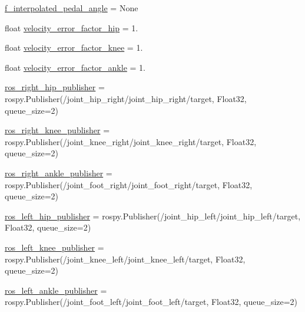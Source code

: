 \begin{DoxyCompactItemize}
\item 
\mbox{\hyperlink{namespacepedal__simulation_af51976e71e077d3bd6d7336c1ed3bbda}{f\+\_\+interpolated\+\_\+pedal\+\_\+angle}} = None
\item 
float \mbox{\hyperlink{namespacepedal__simulation_a056c3f5ea9318245510e21f25d27d64b}{velocity\+\_\+error\+\_\+factor\+\_\+hip}} = 1.
\item 
float \mbox{\hyperlink{namespacepedal__simulation_a264efa3250f86e3ccd49d021fe5de299}{velocity\+\_\+error\+\_\+factor\+\_\+knee}} = 1.
\item 
float \mbox{\hyperlink{namespacepedal__simulation_ae90b8e010bab961fc19ad21ac23d32a3}{velocity\+\_\+error\+\_\+factor\+\_\+ankle}} = 1.
\item 
\mbox{\hyperlink{namespacepedal__simulation_ad3c9df24a0162182eaa313ba9db6c8d5}{ros\+\_\+right\+\_\+hip\+\_\+publisher}} = rospy.\+Publisher(\textquotesingle{}/joint\+\_\+hip\+\_\+right/joint\+\_\+hip\+\_\+right/target\textquotesingle{}, Float32, queue\+\_\+size=2)
\item 
\mbox{\hyperlink{namespacepedal__simulation_add24f7830d3bc483feb54783aa3e27a7}{ros\+\_\+right\+\_\+knee\+\_\+publisher}} = rospy.\+Publisher(\textquotesingle{}/joint\+\_\+knee\+\_\+right/joint\+\_\+knee\+\_\+right/target\textquotesingle{}, Float32, queue\+\_\+size=2)
\item 
\mbox{\hyperlink{namespacepedal__simulation_a80c8e80dd018d69b15af48f30b9af705}{ros\+\_\+right\+\_\+ankle\+\_\+publisher}} = rospy.\+Publisher(\textquotesingle{}/joint\+\_\+foot\+\_\+right/joint\+\_\+foot\+\_\+right/target\textquotesingle{}, Float32, queue\+\_\+size=2)
\item 
\mbox{\hyperlink{namespacepedal__simulation_a2ef1706eba320b87ea0d933416e34266}{ros\+\_\+left\+\_\+hip\+\_\+publisher}} = rospy.\+Publisher(\textquotesingle{}/joint\+\_\+hip\+\_\+left/joint\+\_\+hip\+\_\+left/target\textquotesingle{}, Float32, queue\+\_\+size=2)
\item 
\mbox{\hyperlink{namespacepedal__simulation_ae4ce94ab5921ff0932ebb8fca1a0cce3}{ros\+\_\+left\+\_\+knee\+\_\+publisher}} = rospy.\+Publisher(\textquotesingle{}/joint\+\_\+knee\+\_\+left/joint\+\_\+knee\+\_\+left/target\textquotesingle{}, Float32, queue\+\_\+size=2)
\item 
\mbox{\hyperlink{namespacepedal__simulation_a483a606af7f56639dc52ca41b4971059}{ros\+\_\+left\+\_\+ankle\+\_\+publisher}} = rospy.\+Publisher(\textquotesingle{}/joint\+\_\+foot\+\_\+left/joint\+\_\+foot\+\_\+left/target\textquotesingle{}, Float32, queue\+\_\+size=2)

\end{DoxyCompactItemize}
